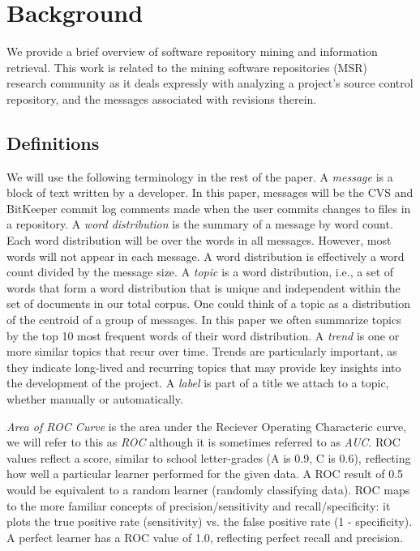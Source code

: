\documentclass[10pt, conference, compsocconf]{IEEEtran}
\begin{document}
\section{Background}

We provide a brief overview of software repository mining and information retrieval.
This work is related to the mining software repositories (MSR)~\cite{msr} research community as it deals expressly with analyzing a project's source control repository, and the messages associated with revisions therein.


\subsection{Definitions}
We will use the following terminology in the rest of the paper.
A \emph{message} is a block of text written by a developer. In this
paper, messages will be the CVS and BitKeeper commit log comments made
when the user commits changes to files in a repository. A \emph{word
  distribution} is the summary of a message by word count. Each word
distribution will be over the words in all messages. However, most
words will not appear in each message. A word distribution is effectively
a word count divided by the message size. A \emph{topic} is a word
distribution, i.e., a set of words that form a word distribution that is
unique and independent within the set of documents in our total
corpus. One could think of a topic as a distribution of the centroid
of a group of messages. In this paper we often summarize topics by the
top 10 most frequent words of their word distribution.  A \emph{trend}
is one or more similar topics that recur over time.  Trends are
particularly important, as they indicate long-lived and recurring
topics that may provide key insights into the development of the
project. A \emph{label} is part of a title we attach to a topic, whether manually or automatically.

\emph{Area of ROC Curve} is the area under the Reciever Operating Characteric curve, we will refer to this as \emph{ROC} although it is sometimes referred to as \emph{AUC}. ROC values reflect a score, similar to school letter-grades (A is 0.9, C is 0.6), reflecting how well a particular learner performed for the given data. A ROC result of 0.5 would be equivalent to a random learner (randomly classifying data). ROC maps to the more familiar concepts of precision/sensitivity and recall/specificity: it plots the true positive rate (sensitivity) vs. the false positive rate (1 - specificity). A perfect learner has a ROC value of 1.0, reflecting perfect recall and precision.
\end{document}

